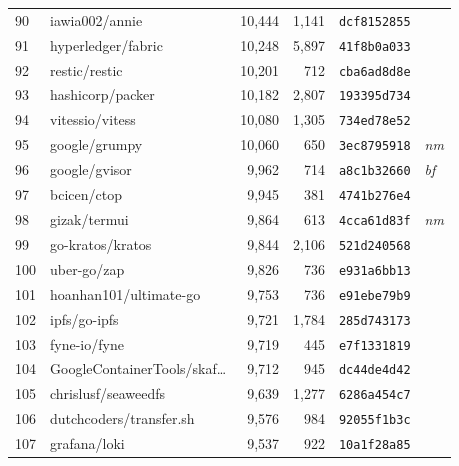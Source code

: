 {\begin{supertabular}{llrrll}
        90  &                     iawia002/annie & 10,444 &  1,141 &  \texttt{dcf8152855} &              \\
        91  &                 hyperledger/fabric & 10,248 &  5,897 &  \texttt{41f8b0a033} &              \\
        92  &                      restic/restic & 10,201 &    712 &  \texttt{cba6ad8d8e} &              \\
        93  &                   hashicorp/packer & 10,182 &  2,807 &  \texttt{193395d734} &              \\
        94  &                    vitessio/vitess & 10,080 &  1,305 &  \texttt{734ed78e52} &              \\
        95  &                      google/grumpy & 10,060 &    650 &  \texttt{3ec8795918} &  \textit{nm} \\
        96  &                      google/gvisor &  9,962 &    714 &  \texttt{a8c1b32660} &  \textit{bf} \\
        97  &                        bcicen/ctop &  9,945 &    381 &  \texttt{4741b276e4} &              \\
        98  &                       gizak/termui &  9,864 &    613 &  \texttt{4cca61d83f} &  \textit{nm} \\
        99  &                   go-kratos/kratos &  9,844 &  2,106 &  \texttt{521d240568} &              \\
        100 &                        uber-go/zap &  9,826 &    736 &  \texttt{e931a6bb13} &              \\
        101 &             hoanhan101/ultimate-go &  9,753 &    736 &  \texttt{e91ebe79b9} &              \\
        102 &                       ipfs/go-ipfs &  9,721 &  1,784 &  \texttt{285d743173} &              \\
        103 &                       fyne-io/fyne &  9,719 &    445 &  \texttt{e7f1331819} &              \\
        104 &    GoogleContainerTools/skaf\ldots &  9,712 &    945 &  \texttt{dc44de4d42} &              \\
        105 &                chrislusf/seaweedfs &  9,639 &  1,277 &  \texttt{6286a454c7} &              \\
        106 &            dutchcoders/transfer.sh &  9,576 &    984 &  \texttt{92055f1b3c} &              \\
        107 &                       grafana/loki &  9,537 &    922 &  \texttt{10a1f28a85} &              \\

\end{supertabular}}
